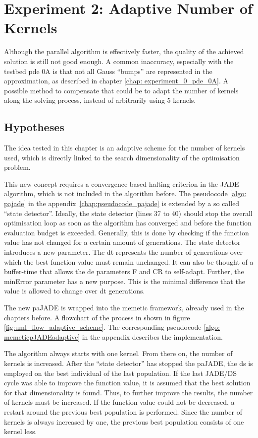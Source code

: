 \documentclass[./\jobname.tex]{subfiles}
\begin{document}
\section {Experiment 2: Adaptive Number of Kernels}
\label{chap:experimet_2}

Although the parallel algorithm is effectively faster, the quality of the achieved solution is still not good enough. A common inaccuracy, especially with the testbed \gls{pde} 0A is that not all Gauss ``bumps'' are represented in the approximation, as described in chapter \ref{chap: experiment_0_pde_0A}. A possible method to compensate that could be to adapt the number of kernels along the solving process, instead of arbitrarily using 5 kernels. 

\subsection{Hypotheses}

The idea tested in this chapter is an adaptive scheme for the number of kernels used, which is directly linked to the search dimensionality of the optimisation problem. 

This new concept requires a convergence based halting criterion in the JADE algorithm, which is not included in the algorithm before. The pseudocode \ref{algo: pajade} in the \mbox{appendix \ref{chap:pseudocode_pajade}} is extended by a so called ``state detector''. Ideally, the state detector (lines 37 to 40) should stop the overall optimisation loop as soon as the algorithm has converged and before the function evaluation budget is exceeded. Generally, this is done by checking if the function value has not changed for a certain amount of generations. The state detector introduces a new parameter. The \gls{dt} represents the number of generations over which the best function value must remain unchanged. It can also be thought of a buffer-time that allows the \gls{de} parameters F and CR to self-adapt. Further, the minError parameter has a new purpose. This is the minimal difference that the value is allowed to change over \gls{dt} generations. 

The new paJADE is wrapped into the memetic framework, already used in the chapters before. A flowchart of the process in shown in figure \ref{fig:uml_flow_adaptive_scheme}. The corresponding pseudocode \ref{algo: memeticpJADEadaptive} in the appendix describes the implementation.

The algorithm always starts with one kernel. From there on, the number of kernels is increased. After the ``state detector'' has stopped the paJADE, the \gls{ds} is employed on the best individual of the last population. If the last JADE/DS cycle was able to improve the function value, it is assumed that the best solution for that dimensionality is found. Thus, to further improve the results, the number of kernels must be increased. If the function value could not be decreased, a restart around the previous best population is performed. Since the number of kernels is always increased by one, the previous best population consists of one kernel less. 
\end{document}
